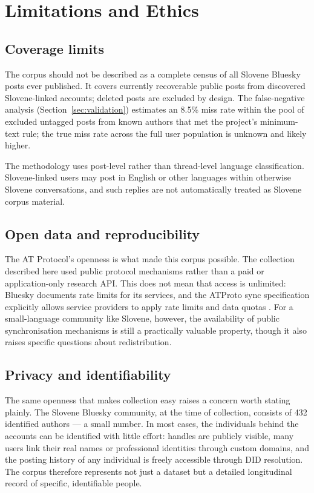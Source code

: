 \section{Limitations and Ethics}\label{sec:limitations}

\subsection{Coverage limits}

The corpus should not be described as a complete census of all Slovene Bluesky posts ever published. It covers currently recoverable public posts from discovered Slovene-linked accounts; deleted posts are excluded by design. The false-negative analysis (Section~\ref{sec:validation}) estimates an 8.5\% miss rate within the pool of excluded untagged posts from known authors that met the project's minimum-text rule; the true miss rate across the full user population is unknown and likely higher.

The methodology uses post-level rather than thread-level language classification. Slovene-linked users may post in English or other languages within otherwise Slovene conversations, and such replies are not automatically treated as Slovene corpus material.

\subsection{Open data and reproducibility}

The AT Protocol's openness is what made this corpus possible. The collection described here used public protocol mechanisms rather than a paid or application-only research API. This does not mean that access is unlimited: Bluesky documents rate limits for its services, and the ATProto sync specification explicitly allows service providers to apply rate limits and data quotas \parencite{atproto-sync,bsky-ratelimits}. For a small-language community like Slovene, however, the availability of public synchronisation mechanisms is still a practically valuable property, though it also raises specific questions about redistribution.

\subsection{Privacy and identifiability}

The same openness that makes collection easy raises a concern worth stating plainly. The Slovene Bluesky community, at the time of collection, consists of 432 identified authors --- a small number. In most cases, the individuals behind the accounts can be identified with little effort: handles are publicly visible, many users link their real names or professional identities through custom domains, and the posting history of any individual is freely accessible through DID resolution. The corpus therefore represents not just a dataset but a detailed longitudinal record of specific, identifiable people.

